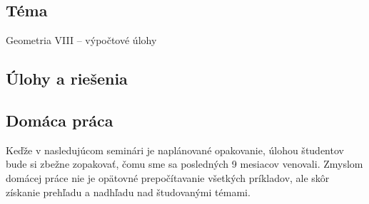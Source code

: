 
\subsection*{Téma}
Geometria VIII -- výpočtové úlohy 



\subsection*{Úlohy a riešenia}












\subsection*{Domáca práca}

Keďže v nasledujúcom seminári je naplánované opakovanie, úlohou študentov bude si zbežne zopakovať, čomu sme sa posledných 9 mesiacov venovali. Zmyslom domácej práce nie je opätovné prepočítavanie všetkých príkladov, ale skôr získanie prehľadu a nadhľadu nad študovanými témami.

